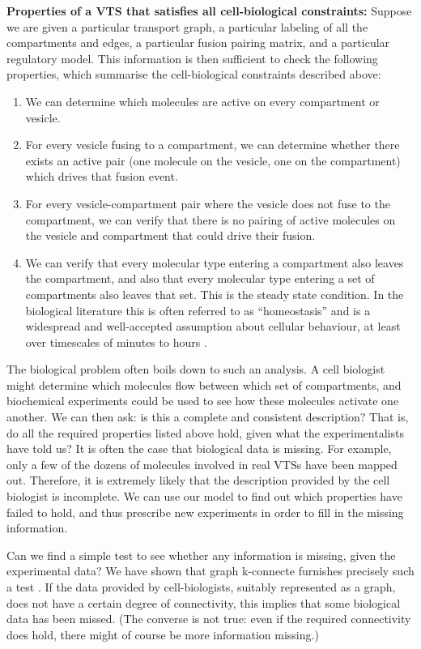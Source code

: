 \textbf{Properties of a VTS that satisfies all cell-biological constraints:} Suppose we are given a particular transport graph, a particular labeling of all the compartments and edges, a particular fusion pairing matrix, and a particular regulatory model. This information is then sufficient to check the following properties, which summarise the cell-biological constraints described above:
\begin{enumerate}
\item We can determine which molecules are active on every compartment or vesicle.
\item For every vesicle fusing to a compartment, we can determine whether there exists an active pair (one molecule on the vesicle, one on the compartment) which drives that fusion event.
\item For every vesicle-compartment pair where the vesicle does not fuse to the compartment, we can verify that there is no pairing of active molecules on the
vesicle and compartment that could drive their fusion.
\item We can verify that every molecular type entering a compartment also leaves the compartment, and also that every molecular type entering a set of compartments also leaves that set. This is the steady state condition. In the biological literature this is often referred to as “homeostasis” and is a widespread and well-accepted assumption about cellular behaviour, at least over timescales of minutes to hours \cite{mani2017}.
\end{enumerate}

The biological problem often boils down to such an analysis. A cell biologist might determine which molecules flow between which set of compartments, and biochemical experiments could be used to see how these molecules activate one another. We can then ask: is this a complete and consistent description? That is, do all the required properties listed above hold, given what the experimentalists have told us? It is often the case that biological data is missing. For example, only a few of the dozens of molecules involved in real VTSs have been mapped out. Therefore, it is extremely likely that the description provided by the cell biologist is incomplete. We can use our model to find out which properties have failed to hold, and thus prescribe new experiments in order to fill in the missing information.

Can we find a simple test to see whether any information is missing, given the experimental data? We have shown that graph k-connecte furnishes precisely such a test \cite{shukla}. If the data provided by cell-biologists, suitably represented as a graph, does not have a certain degree of connectivity, this implies that some biological data has been missed. (The converse is not true: even if the required connectivity does hold, there might of course be more information missing.)

